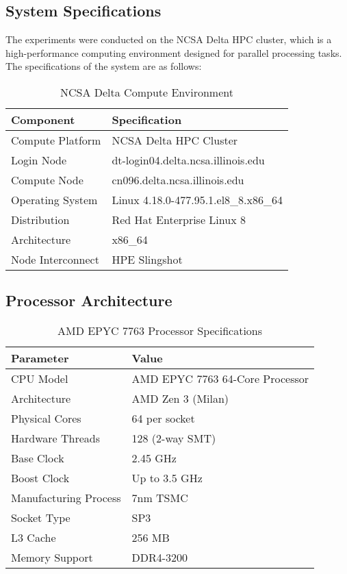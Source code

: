 \documentclass[11pt]{article}
\begin{document}
\subsection{System Specifications}
The experiments were conducted on the NCSA Delta HPC cluster, which is a high-performance computing environment designed for parallel processing tasks. The specifications of the system are as follows:
\begin{table}[H]
\centering
\caption{NCSA Delta Compute Environment}
\label{tab:system_specs}
\begin{tabular}{@{}ll@{}}
\hline
\textbf{Component} & \textbf{Specification} \\
\hline
Compute Platform & NCSA Delta HPC Cluster \\
Login Node & dt-login04.delta.ncsa.illinois.edu \\
Compute Node & cn096.delta.ncsa.illinois.edu \\
Operating System & Linux 4.18.0-477.95.1.el8\_8.x86\_64 \\
Distribution & Red Hat Enterprise Linux 8 \\
Architecture & x86\_64 \\
Node Interconnect & HPE Slingshot \\
\hline
\end{tabular}
\end{table}


\subsection{Processor Architecture}

\begin{table}[H]
\centering
\caption{AMD EPYC 7763 Processor Specifications}
\label{tab:processor_specs}
\begin{tabular}{@{}ll@{}}
\hline
\textbf{Parameter} & \textbf{Value} \\
\hline
CPU Model & AMD EPYC 7763 64-Core Processor \\
Architecture & AMD Zen 3 (Milan) \\
Physical Cores & 64 per socket \\
Hardware Threads & 128 (2-way SMT) \\
Base Clock & 2.45 GHz \\
Boost Clock & Up to 3.5 GHz \\
Manufacturing Process & 7nm TSMC \\
Socket Type & SP3 \\
L3 Cache & 256 MB \\
Memory Support & DDR4-3200 \\
\hline
\end{tabular}
\end{table}
\end{document}
